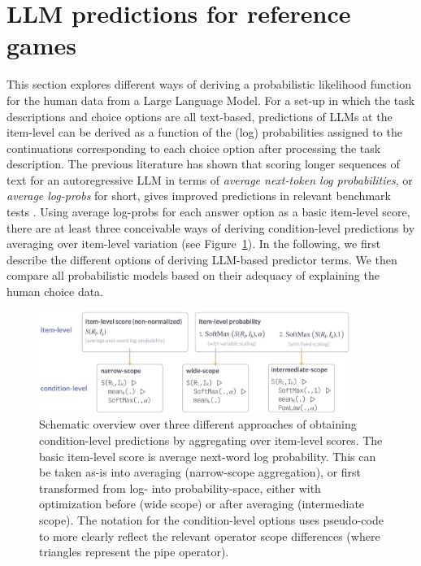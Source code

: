 \documentclass[fleqn]{article}
\begin{document}
\section{LLM predictions for reference games}
\label{llm-predictions-for-reference-games}

This section explores different ways of deriving a probabilistic likelihood function for the human data from a Large Language Model.
For a set-up in which the task descriptions and choice options are all text-based, predictions of LLMs at the item-level can be derived as a function of the (log) probabilities assigned to the continuations corresponding to each choice option after processing the task description.
The previous literature has shown that scoring longer sequences of text for an autoregressive LLM in terms of \emph{average next-token log probabilities}, or \emph{average log-probs} for short, gives improved predictions in relevant benchmark tests \citep[e.g.,][]{BrownMann2020:Language-Models}.
Using average log-probs for each answer option as a basic item-level score, there are at least three conceivable ways of deriving condition-level predictions by averaging over item-level variation (see Figure~\ref{fig:measures-overview}).
In the following, we first describe the different options of deriving LLM-based predictor terms.
We then compare all probabilistic models based on their adequacy of explaining the human choice data.

\begin{figure}
  \centering
  \includegraphics[width=0.9\textwidth]{00-pics/measures-overview.png}
  \caption{
    Schematic overview over three different approaches of obtaining condition-level predictions by aggregating over item-level scores.
    The basic item-level score is average next-word log probability.
    This can be taken as-is into averaging (narrow-scope aggregation), or first transformed from log- into probability-space, either with optimization before (wide scope) or after averaging (intermediate scope).
    The notation for the condition-level options uses pseudo-code to more clearly reflect the relevant operator scope differences (where triangles represent the pipe operator).
  }
  \label{fig:measures-overview}
\end{figure}
\end{document}
